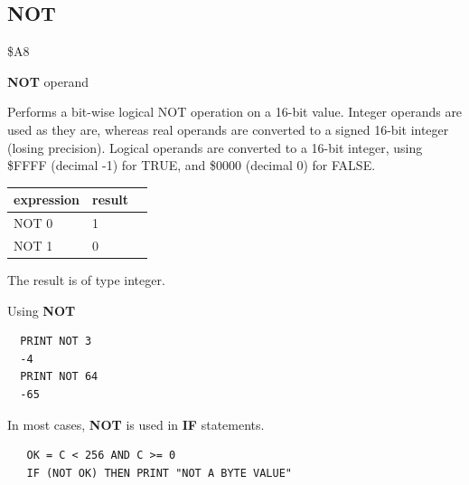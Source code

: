 
\newpage
\subsection{NOT}
\begin{description}[leftmargin=2cm,style=nextline]
\item [Token:] \$A8
\item [Format:] {\bf NOT} operand
\item [Usage:]  Performs a bit-wise
                logical NOT operation on a 16-bit value.
                Integer operands are used as they are, whereas
                real operands are converted to a signed 16-bit integer (losing precision).
                Logical operands are converted to a 16-bit integer,
                using \$FFFF (decimal -1) for TRUE,
                and \$0000 (decimal 0) for FALSE.

\begin{center}
{\ttfamily
\setlength{\tabcolsep}{1mm}
    \begin{tabular}{|l|l|l|}
    \hline
        expression & result  \\
    \hline
        NOT 0  &  1 \\
        NOT 1  &  0 \\
    \hline
\end{tabular}
}
\end{center}

\item [Remarks:] The result is of type integer.

\item [Examples:] Using {\bf NOT}

\begin{tcolorbox}[colback=black,coltext=white]
\verbatimfont{\codefont}
\begin{verbatim}
  PRINT NOT 3
  -4
  PRINT NOT 64
  -65
\end{verbatim}
\end{tcolorbox}

In most cases, {\bf NOT} is used in {\bf IF} statements.

\begin{tcolorbox}[colback=black,coltext=white]
\verbatimfont{\codefont}
\begin{verbatim}
   OK = C < 256 AND C >= 0
   IF (NOT OK) THEN PRINT "NOT A BYTE VALUE"
\end{verbatim}
\end{tcolorbox}
\end{description}

